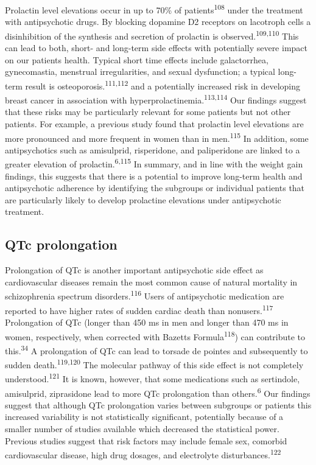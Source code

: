 \documentclass[9pt,english,,jou,floatsintext]{apa6}
\begin{document}
Prolactin level elevations occur in up to 70\% of
patients\textsuperscript{108} under the treatment with antipsychotic
drugs. By blocking dopamine D2 receptors on lacotroph cells a
disinhibition of the synthesis and secretion of prolactin is
observed.\textsuperscript{109,110} This can lead to both, short- and
long-term side effects with potentially severe impact on our patients
health. Typical short time effects include galactorrhea, gynecomastia,
menstrual irregularities, and sexual dysfunction; a typical long-term
result is osteoporosis.\textsuperscript{111,112} and a potentially
increased risk in developing breast cancer in association with
hyperprolactinemia.\textsuperscript{113,114} Our findings suggest that
these risks may be particularly relevant for some patients but not other
patients. For example, a previous study found that prolactin level
elevations are more pronounced and more frequent in women than in
men.\textsuperscript{115} In addition, some antipsychotics such as
amisulprid, risperidone, and paliperidone are linked to a greater
elevation of prolactin.\textsuperscript{6,115} In summary, and in line
with the weight gain findings, this suggests that there is a potential
to improve long-term health and antipsychotic adherence by identifying
the subgroups or individual patients that are particularly likely to
develop prolactine elevations under antipsychotic treatment.

\subsection{QTc prolongation}\label{qtc-prolongation-1}

Prolongation of QTc is another important antipsychotic side effect as
cardiovascular diseases remain the most common cause of natural
mortality in schizophrenia spectrum disorders.\textsuperscript{116}
Users of antipsychotic medication are reported to have higher rates of
sudden cardiac death than nonusers.\textsuperscript{117} Prolongation of
QTc (longer than 450 ms in men and longer than 470 ms in women,
respectively, when corrected with Bazetts Formula\textsuperscript{118})
can contribute to this.\textsuperscript{34} A prolongation of QTc can
lead to torsade de pointes and subsequently to sudden
death.\textsuperscript{119,120} The molecular pathway of this side
effect is not completely understood.\textsuperscript{121} It is known,
however, that some medications such as sertindole, amisulprid,
ziprasidone lead to more QTc prolongation than
others.\textsuperscript{6} Our findings suggest that although QTc
prolongation varies between subgroups or patients this increased
variability is not statistically significant, potentially because of a
smaller number of studies available which decreased the statistical
power. Previous studies suggest that risk factors may include female
sex, comorbid cardiovascular disease, high drug dosages, and electrolyte
disturbances.\textsuperscript{122}
\end{document}
